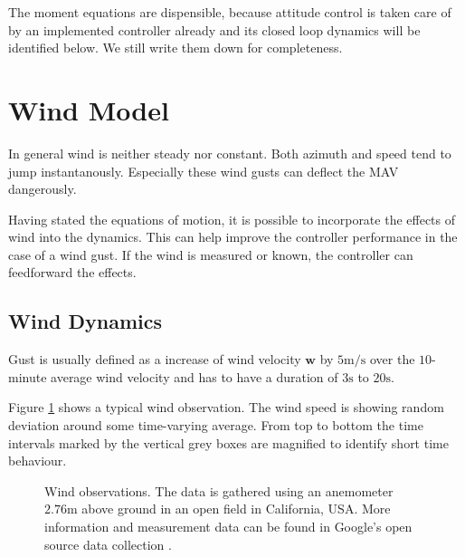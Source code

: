 The moment equations are dispensible, because attitude control is taken care of by an implemented controller already and its closed loop dynamics will be identified below. We still write them down for completeness.

\section{Wind Model}
\label{sec:wind_model}
In general wind is neither steady nor constant. Both azimuth and speed tend to jump instantanously. Especially these wind gusts can deflect the MAV dangerously.

Having stated the equations of motion, it is possible to incorporate the effects of wind into the dynamics. This can help improve the controller performance in the case of a wind gust. If the wind is measured or known, the controller can feedforward the effects.

\subsection{Wind Dynamics}
Gust is usually defined as a increase of wind velocity $\mathbf{w}$ by $5\si{\metre\per\second}$ over the $10$-minute average wind velocity and has to have a duration of $3 \si{\second}$ to $20 \si{\second}$.

Figure \ref{fig:wind_observations} shows a typical wind observation. The wind speed is showing random deviation around some time-varying average. From top to bottom the time intervals marked by the vertical grey boxes are magnified to identify short time behaviour.


\begin{figure}
\centering
{}
\qquad
{}
\qquad
{}
\caption[Wind observations]{Wind observations. The data is gathered using an anemometer $2.76 \si{\metre}$ above ground in an open field in California, USA. More information and measurement data can be found in Google's open source data collection \cite{www:googleosb,www:googleheliostat}.}
\label{fig:wind_observations}
\end{figure}


